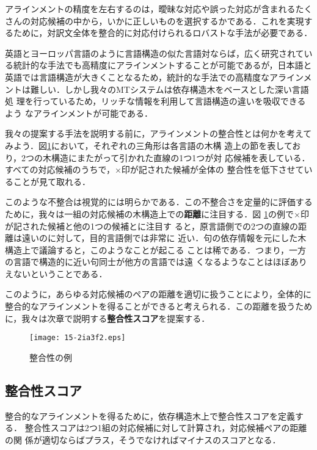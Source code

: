 \documentclass[japanese]{jnlp_1.4}
\begin{document}
アラインメントの精度を左右するのは，曖昧な対応や誤った対応が含まれるたく
さんの対応候補の中から，いかに正しいものを選択するかである．これを実現す
るために，対訳文全体を整合的に対応付けられるロバストな手法が必要である．


英語とヨーロッパ言語のように言語構造の似た言語対ならば，広く研究されてい
る統計的な手法でも高精度にアラインメントすることが可能であるが，日本語と
英語では言語構造が大きくことなるため，統計的な手法での高精度なアラインメ
ントは難しい．しかし我々のMTシステムは依存構造木をベースとした深い言語処
理を行っているため，リッチな情報を利用して言語構造の違いを吸収できるよう
なアラインメントが可能である．


我々の提案する手法を説明する前に，アラインメントの整合性とは何かを考えて
みよう．図\ref{fig:consistency}において，それぞれの三角形は各言語の木構
造上の節を表しており，2つの木構造にまたがって引かれた直線の1つ1つが対
応候補を表している．すべての対応候補のうちで，×印が記された候補が全体の
整合性を低下させていることが見て取れる．


このような不整合は視覚的には明らかである．この不整合さを定量的に評価する
ために，我々は一組の対応候補の木構造上での{\bf 距離}に注目する．図
\ref{fig:consistency}の例で×印が記された候補と他の1つの候補とに注目す
ると，原言語側での2つの直線の距離は遠いのに対して，目的言語側では非常に
近い．句の依存情報を元にした木構造上で議論すると，このようなことが起こる
ことは稀である．つまり，一方の言語で構造的に近い句同士が他方の言語では遠
くなるようなことはほぼありえないということである．


このように，あらゆる対応候補のペアの距離を適切に扱うことにより，全体的に
整合的なアラインメントを得ることができると考えられる．この距離を扱うため
に，我々は次章で説明する{\bf 整合性スコア}を提案する．


\begin{figure}[t]
 \begin{center}
  \texttt{[image: 15-2ia3f2.eps]}
  \caption{整合性の例}
  \label{fig:consistency}
 \end{center}
\end{figure}

\subsection{整合性スコア}

整合的なアラインメントを得るために，依存構造木上で整合性スコアを定義する．
整合性スコアは2つ1組の対応候補に対して計算され，対応候補ペアの距離の関
係が適切ならばプラス，そうでなければマイナスのスコアとなる．
\end{document}
